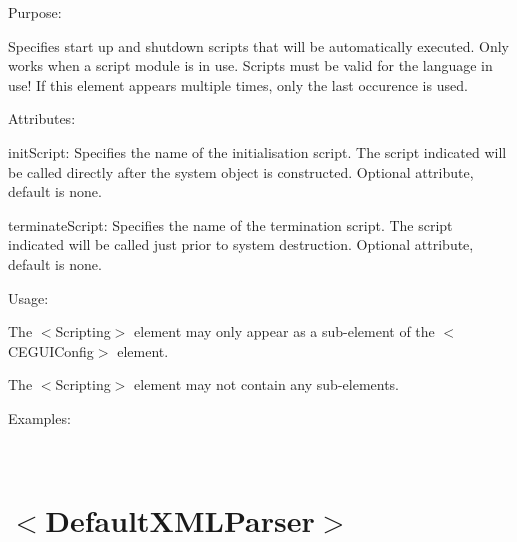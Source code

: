\begin{DoxyItemize}
\item Purpose\+:
\begin{DoxyItemize}
\item Specifies start up and shutdown scripts that will be automatically executed. Only works when a script module is in use. Scripts must be valid for the language in use! If this element appears multiple times, only the last occurence is used.
\end{DoxyItemize}
\item Attributes\+:
\begin{DoxyItemize}
\item {\ttfamily init\+Script\+:} Specifies the name of the initialisation script. The script indicated will be called directly after the system object is constructed. Optional attribute, default is none.
\item {\ttfamily terminate\+Script\+:} Specifies the name of the termination script. The script indicated will be called just prior to system destruction. Optional attribute, default is none.
\end{DoxyItemize}
\item Usage\+:
\begin{DoxyItemize}
\item The $<$Scripting$>$ element may only appear as a sub-\/element of the $<$C\+E\+G\+U\+I\+Config$>$ element.
\item The $<$Scripting$>$ element may not contain any sub-\/elements.
\end{DoxyItemize}
\item Examples\+:
\end{DoxyItemize}

~\newline
 \hypertarget{xml_config_xml_config_xmlparser}{}\section{$<$\+Default\+X\+M\+L\+Parser$>$}\label{xml_config_xml_config_xmlparser}

